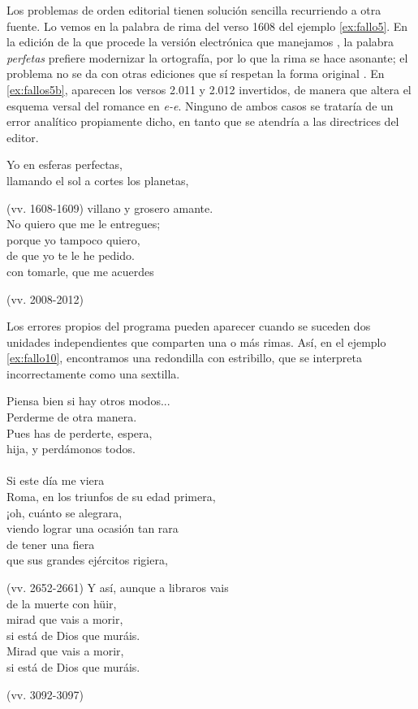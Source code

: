 Los problemas de orden editorial tienen solución sencilla recurriendo a otra fuente. Lo vemos en la palabra de rima del verso 1608 del ejemplo \ref{ex:fallo5}. En la edición de la que procede la versión electrónica que manejamos \parencite{calderon_lves}, la palabra \textit{perfetas} prefiere modernizar la ortografía, por lo que la rima se hace asonante; el problema no se da con otras ediciones que sí respetan la forma original \parencite{calderon_lavidaessuenno}. En \ref{ex:fallos5b}, aparecen los versos 2{.}011 y 2{.}012 invertidos, de manera que altera el esquema versal del romance en \textit{e-e}. Ninguno de ambos casos se trataría de un error analítico propiamente dicho, en tanto que se atendría a las directrices del editor.

\begin{exe}
	\ex\label{ex:fallo5}Yo en esferas perfectas,\\	
	llamando el sol a cortes los planetas,\strut\hfill(vv. 1608-1609)
	\ex\label{ex:fallos5b}villano y grosero amante.\\
	No quiero que me le entregues;\\
	porque yo tampoco quiero,\\
	de que yo te le he pedido.\\
	con tomarle, que me acuerdes\strut\hfill(vv. 2008-2012)
\end{exe}

Los errores propios del programa pueden aparecer cuando se suceden dos unidades independientes que comparten una o más rimas. Así, en el ejemplo \ref{ex:fallo10}, encontramos una redondilla con estribillo, que se interpreta incorrectamente como una sextilla.

\begin{exe}
	\ex\label{ex:fallo9}Piensa bien si hay otros modos...	\\
	Perderme de otra manera.	\\
	Pues has de perderte, espera,\\	
	hija, y perdámonos todos.\\\\
	Si este día me viera\\
	Roma, en los triunfos de su edad primera,\\
	¡oh, cuánto se alegrara,\\
	viendo lograr una ocasión tan rara\\
	de tener una fiera	\\
	que sus grandes ejércitos rigiera,\strut\hfill (vv. 2652-2661)
	\ex\label{ex:fallo10}Y así, aunque a libraros vais\\
	de la muerte con hüir, \\
	mirad que vais a morir,\\
	si está de Dios que muráis.\\
	Mirad que vais a morir,\\
	si está de Dios que muráis.\strut\hfill(vv. 3092-3097)
\end{exe}

